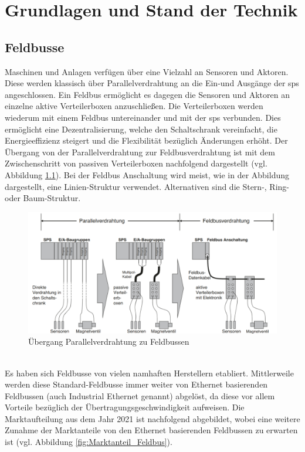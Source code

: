 \documentclass[ a4paper,
                oneside,
                toc=bibliography,
                toc=listof
                ]{scrbook}
\begin{document}
	\chapter{Grundlagen und Stand der Technik}
	
	\section{Feldbusse}
	\label{sec:Feldbus}
	Maschinen und Anlagen verfügen über eine Vielzahl an Sensoren und Aktoren. Diese werden klassisch über Parallelverdrahtung an die Ein-und Ausgänge der \ac{sps} angeschlossen. Ein Feldbus ermöglicht es dagegen die Sensoren und Aktoren an einzelne aktive Verteilerboxen anzuschließen. Die Verteilerboxen werden wiederum mit einem Feldbus untereinander und mit der \ac{sps} verbunden. Dies ermöglicht eine Dezentralisierung, welche den Schaltschrank vereinfacht, die Energieeffizienz steigert und die Flexibilität bezüglich Änderungen erhöht. Der Übergang von der Parallelverdrahtung zur Feldbusverdrahtung ist mit dem Zwischenschritt von passiven Verteilerboxen nachfolgend dargestellt (vgl. Abbildung \ref{fig:Parallel_vs_Feldbus}). Bei der Feldbus Anschaltung wird meist, wie in der Abbildung dargestellt, eine Linien-Struktur verwendet. Alternativen sind die Stern-, Ring- oder Baum-Struktur. \cite{hering2012elektrotechnik}
	\begin{figure}[!ht]
		\centering
		\includegraphics[width=1.0\linewidth]{./images/Parallelverdrahtung_Feldbus.png}
		\caption{Übergang Parallelverdrahtung zu Feldbussen \cite{hering2012elektrotechnik}}
		\label{fig:Parallel_vs_Feldbus}
	\end{figure}\\
	Es haben sich Feldbusse von vielen namhaften Herstellern etabliert. Mittlerweile werden diese Standard-Feldbusse immer weiter von Ethernet basierenden Feldbussen (auch Industrial Ethernet genannt) abgelöst, da diese vor allem Vorteile bezüglich der Übertragungsgeschwindigkeit aufweisen. Die Marktaufteilung aus dem Jahr 2021 ist nachfolgend abgebildet, wobei eine weitere Zunahme der Marktanteile von den Ethernet basierenden Feldbussen zu erwarten ist (vgl. Abbildung \ref{fig:Marktanteil_Feldbus}). \cite{hering2012elektrotechnik} \cite{Marktanteile_HMS}\\
\end{document}
